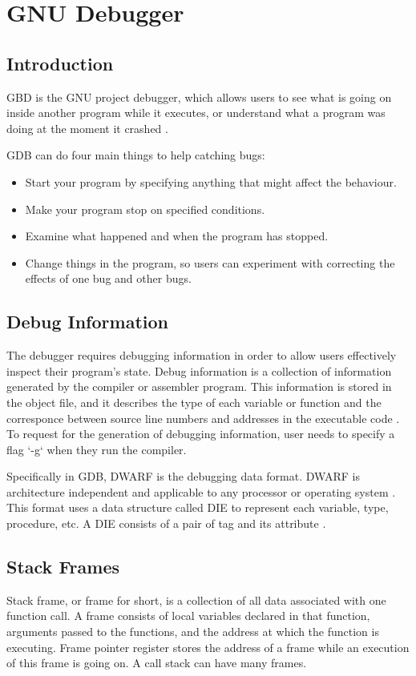 \chapter{GNU Debugger} \label{GDB}

\section{Introduction}
GBD is the GNU project debugger, which allows users to see what is going on
inside another program while it executes, or understand what a program was
doing at the moment it crashed \cite{reference3}.

GDB can do four main things to help catching bugs:
\begin{itemize}
\item Start your program by specifying anything that might affect the
behaviour.
\item Make your program stop on specified conditions.
\item Examine what happened and when the program has stopped.
\item Change things in the program, so users can experiment with correcting the
effects of one bug and other bugs.
\end{itemize}

\section{Debug Information}
The debugger requires debugging information in order to allow users effectively inspect
their program's state. Debug information is a collection of information
generated by the compiler or assembler program. This information is stored in
the object file, and it describes the type of each variable or function and
the corresponce between source line numbers and addresses in the executable
code \cite{reference6}. To request for the generation of debugging information,
user needs to specify a flag `-g` when they run the compiler.

Specifically in GDB, DWARF is the debugging data format. DWARF is architecture
independent and applicable to any processor or operating system
\cite{reference7}. This format uses a data structure called DIE to represent
each variable, type, procedure, etc. A DIE consists of a pair of tag
and its attribute \cite{reference8}.

\section{Stack Frames}
Stack frame, or frame for short, is a collection of all data associated with
one function call. A frame consists of local variables declared in that
function, arguments passed to the functions, and the address at which the
function is executing. Frame pointer register stores the address of a frame
while an execution of this frame is going on. A call stack can have many frames.

